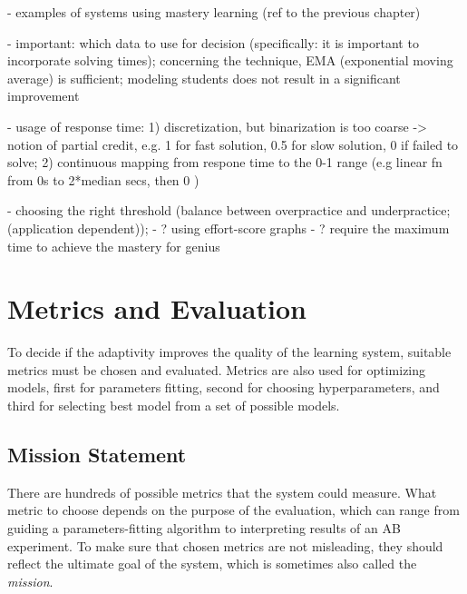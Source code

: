 - examples of systems using mastery learning (ref to the previous chapter)

- important: which data to use for decision (specifically: it is important to
incorporate solving times); concerning the technique, EMA (exponential moving
average) is sufficient; modeling students does not result in a significant
improvement \cite{alg.mastery}

- usage of response time:
1) discretization, but binarization is too coarse
-> notion of partial credit, e.g. 1 for fast solution, 0.5 for slow solution,
0 if failed to solve;
2) continuous mapping from respone time to the 0-1 range
(e.g linear fn from 0s to 2*median secs, then 0 \cite{alg.mastery})


- choosing the right threshold (balance between overpractice and underpractice;
(application dependent));
- ? using effort-score graphs \cite{alg.mastery}
- ? require the maximum time to achieve the mastery for genius



\section{Metrics and Evaluation}
\label{sec:metrics-and-evaluation}


To decide if the adaptivity improves the quality of the learning system,
  suitable metrics must be chosen and evaluated.
Metrics are also used for optimizing models,
  first for parameters fitting, second for choosing hyperparameters,
  and third for selecting best model from a set of possible models.


\subsection{Mission Statement}
\label{sec:mission}

There are hundreds of possible metrics that the system could measure.
What metric to choose depends on the purpose of the evaluation,
  which can range from guiding a parameters-fitting algorithm
  to interpreting results of an AB experiment.
To make sure that chosen metrics are not misleading,
  they should reflect the ultimate goal of the system,
  which is sometimes also called the \emph{mission}.

